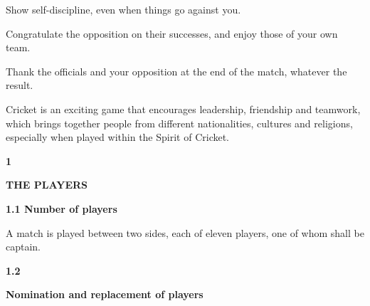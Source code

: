 \documentclass[12pt]{article}
\begin{document}
\vspace{\baselineskip}
{\fontsize{9pt}{10.8pt}\selectfont Show self-discipline, even when things go against you.\par}\par


\vspace{\baselineskip}
{\fontsize{9pt}{10.8pt}\selectfont Congratulate the opposition on their successes, and enjoy those of your own team.\par}\par


\vspace{\baselineskip}
{\fontsize{9pt}{10.8pt}\selectfont Thank the officials and your opposition at the end of the match, whatever the result.\par}\par


\vspace{\baselineskip}
{\fontsize{9pt}{10.8pt}\selectfont Cricket is an exciting game that encourages leadership, friendship and teamwork, which brings together people from different nationalities, cultures and religions, especially when played within the Spirit of Cricket.\par}\par


\vspace{\baselineskip}
{\fontsize{16pt}{19.2pt}\selectfont \textbf{1 \tabto{0.29in} }{\fontsize{15pt}{18.0pt}\selectfont \textbf{THE PLAYERS}\par}\par}\par


\vspace{\baselineskip}
{\fontsize{11pt}{13.2pt}\selectfont \textbf{1.1 \tabto{0.47in} Number of players}\par}\par


\vspace{\baselineskip}
{\fontsize{9pt}{10.8pt}\selectfont A match is played between two sides, each of eleven players, one of whom shall be captain.\par}\par


\vspace{\baselineskip}
{\fontsize{11pt}{13.2pt}\selectfont \textbf{1.2 \tabto{0.47in} }{\fontsize{10pt}{12.0pt}\selectfont \textbf{Nomination and replacement of players}\par}\par}\par
\end{document}
